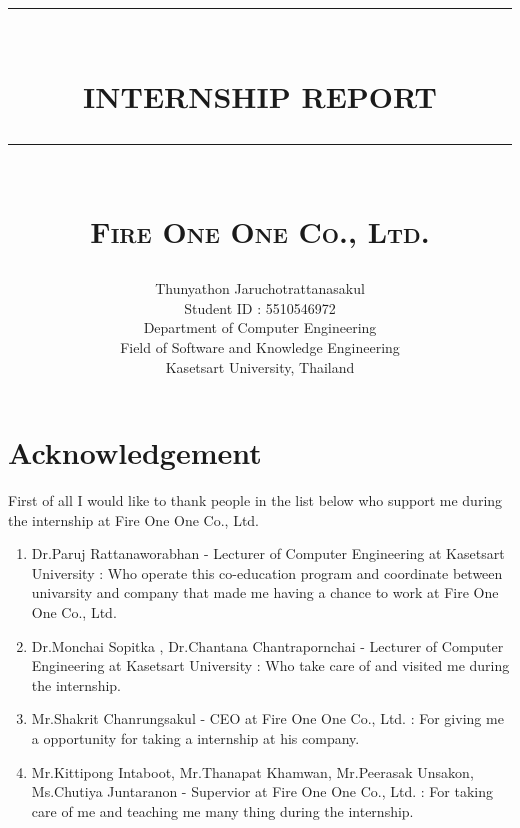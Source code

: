 \documentclass[12pt]{report}
\newcommand{\HRule}[1]{\rule{\linewidth}{#1}}
\begin{document}
\title
	{ 
		\normalsize \textsc{}
		\\ [2.0cm]
		\HRule{0.5pt} \\
		\LARGE \textbf{\uppercase{Internship Report}}
		\HRule{2pt} \\ [0.5cm]
		\normalsize \textsc{Fire One One Co., Ltd.}
		\\ [2.0cm]
	}
\date{}


\author{
		Thunyathon Jaruchotrattanasakul \\
		Student ID : 5510546972 \\ 
		[1.0cm]
		Department of Computer Engineering \\
		Field of Software and Knowledge Engineering \\
		Kasetsart University, Thailand \\
		}

\maketitle

\newpage

\section*{Acknowledgement}
	First of all I would like to thank people in the list below who support me during the internship at Fire One One Co., Ltd.

	\begin{enumerate}
		\item Dr.Paruj Rattanaworabhan - Lecturer of Computer Engineering at Kasetsart University : Who operate this co-education program and coordinate between univarsity and company that made me having a chance to work at Fire One One Co., Ltd.

		\item Dr.Monchai Sopitka , Dr.Chantana Chantrapornchai - Lecturer of Computer Engineering at Kasetsart University : Who take care of and visited me during the internship.
		
		\item Mr.Shakrit Chanrungsakul - CEO at Fire One One Co., Ltd. : For giving me a opportunity for taking a internship at his company.

		\item Mr.Kittipong Intaboot, Mr.Thanapat Khamwan, Mr.Peerasak Unsakon, Ms.Chutiya Juntaranon - Supervior at Fire One One Co., Ltd. : For taking care of me and teaching me many thing during the internship.
	\end{enumerate}
\end{document}
